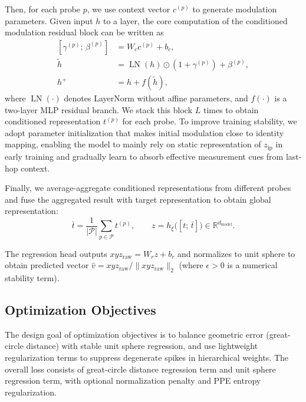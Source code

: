 \documentclass[runningheads]{llncs}
\begin{document}
Then, for each probe $p$, we use context vector $c^{(p)}$ to generate modulation parameters. Given input $h$ to a layer, the core computation of the conditioned modulation residual block can be written as
\begin{equation}
\begin{aligned}
\left[\gamma^{(p)};\, \beta^{(p)}\right] &= W_c c^{(p)} + b_c,\\
\tilde{h} &= \operatorname{LN}(h)\odot \left(1+\gamma^{(p)}\right) + \beta^{(p)},\\
h^{+} &= h + f(\tilde{h}),
\end{aligned}
\label{eq:conditioned_modulation}
\end{equation}
where $\operatorname{LN}(\cdot)$ denotes LayerNorm without affine parameters, and $f(\cdot)$ is a two-layer MLP residual branch. We stack this block $L$ times to obtain conditioned representation $t^{(p)}$ for each probe. To improve training stability, we adopt parameter initialization that makes initial modulation close to identity mapping, enabling the model to mainly rely on static representation of $z_{\text{ip}}$ in early training and gradually learn to absorb effective measurement cues from last-hop context.

Finally, we average-aggregate conditioned representations from different probes and fuse the aggregated result with target representation to obtain global representation:
\begin{equation}
\bar{t}=\frac{1}{|\mathcal{P}|}\sum_{p\in\mathcal{P}} t^{(p)},
\qquad
z=h_\xi\!\big([t;\, \bar{t}]\big)\in\mathbb{R}^{d_{\text{model}}}.
\label{eq:fusion}
\end{equation}

The regression head outputs $xyz_{\text{raw}} = W_r z + b_r$ and normalizes to unit sphere to obtain predicted vector $\hat{v} = xyz_{\text{raw}}/\|xyz_{\text{raw}}\|_2$ (where $\epsilon>0$ is a numerical stability term).

\subsection{Optimization Objectives}

The design goal of optimization objectives is to balance geometric error (great-circle distance) with stable unit sphere regression, and use lightweight regularization terms to suppress degenerate spikes in hierarchical weights. The overall loss consists of great-circle distance regression term and unit sphere regression term, with optional normalization penalty and PPE entropy regularization.
\end{document}
